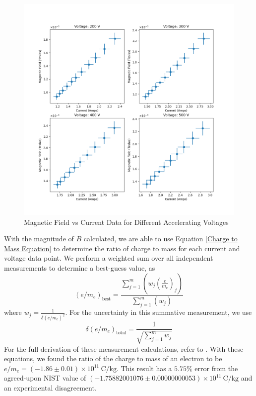 \documentclass[prX,nofootinbib,notitlepage]{revtex4-1}
\begin{document}
\begin{figure}[ht]
        \centering
        \includegraphics[width=0.75\linewidth]{MagneticField_vs_Current.png}
        \caption{Magnetic Field vs Current Data for Different Accelerating Voltages}
        \label{fig:mag_field_data}
\end{figure}

With the magnitude of $B$ calculated, we are able to use Equation \ref{Charge to Mass Equation} to determine the ratio of charge to mass for each current and voltage data point. We perform a weighted sum over all independent measurements to determine a best-guess value, as
\begin{equation}
(e/m_{e})_\text{best} = \frac{\sum\limits_{j=1}^{m}\left(w_{j}\left(\frac{e}{m_e}\right)_{j}\right)}{\sum\limits_{j=1}^{m} (w_{j})}
\end{equation}
where $w_{j} = \frac{1}{\delta(e/m_{e})^2}$. For the uncertainty in this summative measurement, we use
\begin{equation}
\delta(e/m_{e})_\text{total} = \frac{1}{\sqrt{\sum\limits_{j=1}^{m} w_{j}}}
\end{equation}
For the full derivation of these measurement calculations, refer to \cite{Lyons}. With these equations, we found the ratio of the charge to mass of an electron to be $\boxed{e/m_{e} = (-1.86 \pm 0.01) \times 10^{11} ~ \text{C/kg}}$. This result has a $5.75\%$ error from the agreed-upon NIST value of $(-1.75882001076 \pm 0.00000000053) \times 10^{11}~\text{C/kg}$ and an experimental disagreement. 
\end{document}
